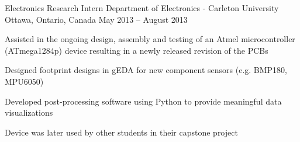 \begin{cventries}
  \cventry
    {Electronics Research Intern} %
    {Department of Electronics - Carleton University} %
    {Ottawa, Ontario, Canada} %
    {May 2013 – August 2013} %
    {
      \begin{cvitems} %
        \item {Assisted in the ongoing design, assembly and testing of an Atmel microcontroller (ATmega1284p) device resulting in a newly released revision of the PCBs}
        \item {Designed footprint designs in gEDA for new component sensors (e.g. BMP180, MPU6050)}
        \item {Developed post-processing software using Python to provide meaningful data visualizations}
        \item {Device was later used by other students in their capstone project}
      \end{cvitems}
    }

\end{cventries}
